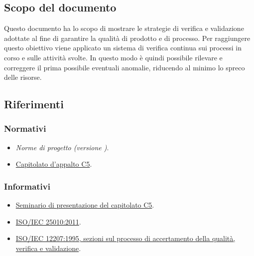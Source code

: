 \documentclass[../piano-di-qualifica.tex]{subfiles}
\begin{document}
\subsection{Scopo del documento}%
\label{sub:scopo_del_documento}
Questo documento ha lo scopo di mostrare le strategie di verifica e validazione adottate al fine di garantire la qualità di prodotto e di processo.
Per raggiungere questo obiettivo viene applicato un sistema di verifica continua sui processi in corso e sulle attività svolte.
In questo modo è quindi possibile rilevare e correggere il prima possibile eventuali anomalie, riducendo al minimo lo spreco delle risorse.


\scopoDelProdottoEGlossario{}

\subsection{Riferimenti}%
\label{sub:riferimenti}
\subsubsection{Normativi}%
\label{par:normativi}
\begin{itemize}
  \item \textit{Norme di progetto (versione \versione)}.
  \item \href{https://www.math.unipd.it/~tullio/IS-1/2019/Progetto/C5.pdf}{Capitolato d'appalto C5}.
\end{itemize}
\subsubsection{Informativi}%
\label{par:informativi}
\begin{itemize}
  \item \href{https://www.math.unipd.it/~tullio/IS-1/2019/Dispense/C5a.pdf}{Seminario di presentazione del capitolato C5}.
  \item \href{https://iso25000.com/index.php/en/iso-25000-standards/iso-25010}{ISO/IEC 25010:2011}.
  \item \href{https://www.math.unipd.it/~tullio/IS-1/2009/Approfondimenti/ISO_12207-1995.pdf}{ISO/IEC 12207:1995, sezioni sul processo di accertamento della qualità, verifica e validazione}.
\end{itemize}
\end{document}
